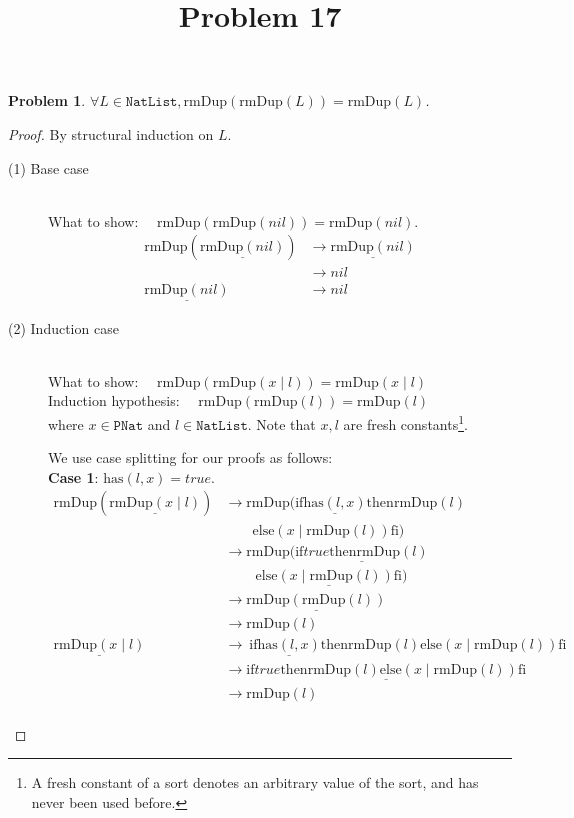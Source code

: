 \documentclass[12pt, a4paper]{article}
\title{Problem 17}
\date{\vspace{-5ex}}
\newtheorem{problem}{Problem}
\newcommand{\rel}[1]{\mathrel{#1}}
\newcommand{\rmx}[1]{\mathrm{#1}}
\newcommand{\larrow}{\longrightarrow}
\newcommand{\under}{\underline}
\begin{document}
\maketitle

\begin{problem}
$\forall L \in \mathtt{NatList}, \rmx{rmDup}(\rmx{rmDup}(L)) = \rmx{rmDup}(L)$.
\end{problem}
\begin{proof}
By structural induction on $L$.
\begin{description}
\item[(1) Base case]~\\
\noindent
What to show: $\quad \rmx{rmDup}(\rmx{rmDup}(nil)) = \rmx{rmDup}(nil)$.
\begin{align*}
\rmx{rmDup}(\under{\rmx{rmDup}(nil)})
	&\larrow \under{\rmx{rmDup}(nil)} \tag{by rmDup1} \\
	&\larrow nil \tag{by rmDup1} \\
\under{\rmx{rmDup}(nil)}
	&\larrow nil \tag{by rmDup1}
\end{align*}

\item[(2) Induction case]~\\
What to show: $\quad \rmx{rmDup}(\rmx{rmDup}(x \mid l)) = \rmx{rmDup}(x \mid l)$\\
Induction hypothesis: $\quad \rmx{rmDup}(\rmx{rmDup}(l)) = \rmx{rmDup}(l)$  \\
where $x \in \mathtt{PNat}$ and $l \in \mathtt{NatList}$.
Note that $x, l$ are fresh constants\footnote{A fresh constant of a sort denotes an arbitrary value of the sort, and has never been used before.}.

We use case splitting for our proofs as follows: \\
\textbf{Case 1}: $\rmx{has}(l, x) = true$.
\begin{align*}
\rmx{rmDup}(\under{\rmx{rmDup}(x \mid l)})
	&\larrow \rmx{rmDup}(\rel{\rmx{if}} \under{\rmx{has}(l, x)} \rel{\rmx{then}} \rmx{rmDup}(l) \\
	&\quad \quad \rel{\rmx{else}} (x \mid \rmx{rmDup}(l)) \rel{\rmx{fi}}) \tag{by rmDup2} \\
	&\larrow \rmx{rmDup}(\under{\rel{\rmx{if}} true \rel{\rmx{then}} \rmx{rmDup}(l)} \\
	&\quad \quad\ \under{\rel{\rmx{else}} (x \mid \rmx{rmDup}(l)) \rel{\rmx{fi}}}) \tag{by case splitting} \\
	&\larrow \under{\rmx{rmDup}(\rmx{rmDup}(l))} \tag{by if1} \\
	&\larrow \rmx{rmDup}(l) \tag{by IH} \\
\under{\rmx{rmDup}(x \mid l)}
	&\larrow\ \rel{\rmx{if}} \under{\rmx{has}(l, x)} \rel{\rmx{then}} \rmx{rmDup}(l) \rel{\rmx{else}} (x \mid \rmx{rmDup}(l)) \rel{\rmx{fi}} \tag{by rmDup2} \\
	&\larrow \under{\rel{\rmx{if}} true \rel{\rmx{then}} \rmx{rmDup}(l) \rel{\rmx{else}} (x \mid \rmx{rmDup}(l)) \rel{\rmx{fi}}} \tag{by case splitting} \\
	&\larrow \rmx{rmDup}(l) \tag{by if1} \\
\end{align*}


\end{description}
\end{proof}
\end{document}
